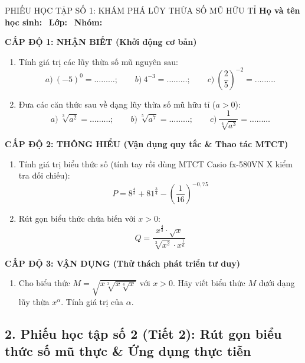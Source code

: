\documentclass[12pt, a4paper]{article}
\begin{document}
\begin{pedabox}{PHIẾU HỌC TẬP SỐ 1: KHÁM PHÁ LŨY THỪA SỐ MŨ HỮU TỈ}
\textbf{Họ và tên học sinh:} \dotfill \ \textbf{Lớp:} \dotfill \ \textbf{Nhóm:} \dotfill

\noindent \textbf{CẤP ĐỘ 1: NHẬN BIẾT (Khởi động cơ bản)}
\begin{enumerate}[leftmargin=0.6cm]
    \item Tính giá trị các lũy thừa số mũ nguyên sau:
    $$a) \ (-5)^0 = \dots\dots\dots; \qquad b) \ 4^{-3} = \dots\dots\dots; \qquad c) \ \left(\dfrac{2}{5}\right)^{-2} = \dots\dots\dots$$
    \item Đưa các căn thức sau về dạng lũy thừa số mũ hữu tỉ ($a > 0$):
    $$a) \ \sqrt[3]{a^2} = \dots\dots\dots; \qquad b) \ \sqrt[5]{a^7} = \dots\dots\dots; \qquad c) \ \dfrac{1}{\sqrt[4]{a^3}} = \dots\dots\dots$$
\end{enumerate}

\noindent \textbf{CẤP ĐỘ 2: THÔNG HIỂU (Vận dụng quy tắc \& Thao tác MTCT)}
\begin{enumerate}[leftmargin=0.6cm]
    \item Tính giá trị biểu thức số (tính tay rồi dùng MTCT Casio fx-580VN X kiểm tra đối chiếu):
    $$P = 8^{\frac{4}{3}} + 81^{\frac{3}{4}} - \left(\dfrac{1}{16}\right)^{-0{,}75}$$
    \item Rút gọn biểu thức chứa biến với $x > 0$:
    $$Q = \dfrac{x^{\frac{4}{3}} \cdot \sqrt{x}}{\sqrt[3]{x^2} \cdot x^{\frac{1}{6}}}$$
\end{enumerate}

\noindent \textbf{CẤP ĐỘ 3: VẬN DỤNG (Thử thách phát triển tư duy)}
\begin{enumerate}[leftmargin=0.6cm]
    \item Cho biểu thức $M = \sqrt{x \sqrt[3]{x \sqrt[4]{x}}}$ với $x > 0$. Hãy viết biểu thức $M$ dưới dạng lũy thừa $x^\alpha$. Tính giá trị của $\alpha$.
\end{enumerate}
\end{pedabox}

\subsection*{2. Phiếu học tập số 2 (Tiết 2): Rút gọn biểu thức số mũ thực \& Ứng dụng thực tiễn}
\end{document}
